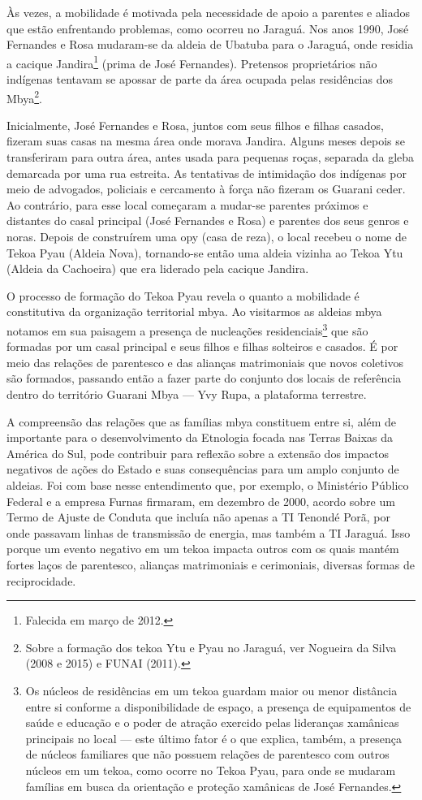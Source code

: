 Às vezes, a mobilidade é motivada pela necessidade de apoio a parentes e
aliados que estão enfrentando problemas, como ocorreu no Jaraguá. Nos
anos 1990, José Fernandes e Rosa mudaram-se da aldeia de Ubatuba para o
Jaraguá, onde residia a cacique Jandira\footnote{Falecida em março de
2012.} (prima de José Fernandes). Pretensos proprietários não indígenas
tentavam se apossar de parte da área ocupada pelas residências dos
Mbya\footnote{Sobre a formação dos tekoa Ytu e Pyau no Jaraguá, ver
Nogueira da Silva (2008 e 2015) e FUNAI (2011).}. 

Inicialmente, José Fernandes e Rosa, juntos com seus filhos e filhas
casados, fizeram suas casas na mesma área onde morava Jandira. Alguns
meses depois se transferiram para outra área, antes usada para pequenas
roças, separada da gleba demarcada por uma rua estreita. As tentativas
de intimidação dos indígenas por meio de advogados, policiais e
cercamento à força não fizeram os Guarani ceder. Ao contrário, para
esse local começaram a mudar-se parentes próximos e distantes do casal
principal (José Fernandes e Rosa) e parentes dos seus genros e noras.
Depois de construírem uma opy (casa de reza), o local recebeu o nome de
Tekoa Pyau (Aldeia Nova), tornando-se então uma aldeia vizinha ao Tekoa
Ytu (Aldeia da Cachoeira) que era liderado pela cacique Jandira.

O processo de formação do Tekoa Pyau revela o quanto a mobilidade é
constitutiva da organização territorial mbya. Ao visitarmos as aldeias
mbya notamos em sua paisagem a presença de nucleações
residenciais\footnote{Os núcleos de residências em um tekoa guardam
maior ou menor distância entre si conforme a disponibilidade de espaço,
a presença de equipamentos de saúde e educação e o poder de atração
exercido pelas lideranças xamânicas principais no local — este último
fator é o que explica, também, a presença de núcleos familiares que não
possuem relações de parentesco com outros núcleos em um tekoa, como
ocorre no Tekoa Pyau, para onde se mudaram famílias em busca da
orientação e proteção xamânicas de José Fernandes.} que são formadas
por um casal principal e seus filhos e filhas solteiros e casados. É
por meio das relações de parentesco e das alianças matrimoniais que
novos coletivos são formados, passando então a fazer parte do conjunto
dos locais de referência dentro do território Guarani Mbya — Yvy Rupa,
a plataforma terrestre.

A compreensão das relações que as famílias mbya constituem entre si,
além de importante para o desenvolvimento da Etnologia focada nas
Terras Baixas da América do Sul, pode contribuir para reflexão sobre a
extensão dos impactos negativos de ações do Estado e suas consequências
para um amplo conjunto de aldeias. Foi com base nesse entendimento que,
por exemplo, o Ministério Público Federal e a empresa Furnas firmaram,
em dezembro de 2000, acordo sobre um Termo de Ajuste de Conduta que
incluía não apenas a TI Tenondé Porã, por onde passavam linhas de
transmissão de energia, mas também a TI Jaraguá. Isso porque um evento
negativo em um tekoa impacta outros com os quais mantém fortes laços de
parentesco, alianças matrimoniais e cerimoniais, diversas formas de
reciprocidade.

